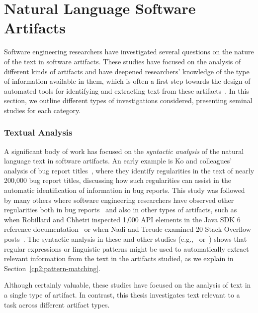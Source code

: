 \section{Natural Language Software Artifacts}
\label{cp2:text-in-se}




Software engineering researchers
have investigated several questions on the nature of the text in software artifacts.
These studies have focused on the analysis of different kinds of artifacts and have deepened researchers' knowledge of the type of information available in them,
 which is often a first step towards the design of automated tools 
for identifying and extracting text from these artifacts~\cite{Arya2019, Maalej2013}.
In this section, we outline 
different types of investigations considered,
presenting seminal studies for each category.



\subsubsection{Textual Analysis} 

A significant body of work has 
focused on the \textit{syntactic analysis} of the natural language text 
in software artifacts. An early example
is Ko and colleagues' analysis of bug report titles~\cite{Ko2006},
where they identify regularities in the text of nearly 200,000 bug report titles,
discussing how such regularities can 
assist in the automatic identification 
of information in bug reports. 
This study was followed by many others where 
software engineering researchers have 
observed other regularities both in bug reports~\cite{Rastkar2010, Chaparro2016}
and also in other types of artifacts, such as 
when Robillard  and Chhetri inspected 1,000 API elements in the Java SDK 6 
reference documentation~\cite{Maalej2013} or when 
Nadi and Treude examined 20 Stack Overflow posts~\cite{nadi2020}.
The syntactic analysis in these and other studies (e.g.,~\cite{chaparro2019} or~\cite{lin2019})
shows that regular expressions or 
linguistic patterns 
might be used to automatically extract 
relevant information from the text  
in the artifacts studied, as we explain in Section~\ref{cp2:pattern-matching}.

Although certainly valuable, these studies have focused on the analysis of 
text in a single type of artifact. In contrast, this thesis investigates 
text relevant to a task across different artifact types.





